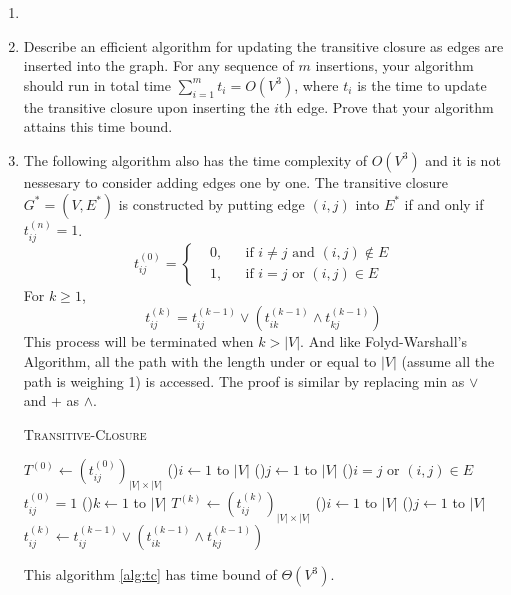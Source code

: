 \documentclass[12pt,a4paper]{article}
\makeatletter
\newtheorem*{solution}{Solution}
\theoremstyle{definition}
\renewenvironment{solution}[1][Solution] {\par\pushQED{\qed}\normalfont\topsep6\p@\@plus6\p@\relax\trivlist\item[\hskip\labelsep\bfseries#1\@addpunct{.}]\ignorespaces}{\popQED\endtrivlist\@endpefalse} \makeatother
\makeatother
\begin{document}
\begin{enumerate}
\begin{enumerate}
\begin{solution}
		\end{solution}
	    \item Describe an efficient algorithm for updating the transitive closure as edges are inserted into the graph. For any sequence of $m$ insertions, your algorithm should run in total time $\sum_{i=1}^m t_i=O(V^3)$, where $t_i$ is the time to update the transitive closure upon inserting the $i$th edge. Prove that your algorithm attains this time bound.
	    \begin{solution}
			The following algorithm also has the time complexity of $O(V^3)$ and it is not nessesary to consider adding edges one by one. The transitive closure $G^*=(V,E^*)$ is constructed by putting edge $(i,j)$ into $E^*$ if and only if $t_{ij}^{(n)}=1$.
			\begin{equation*}
				t_{ij}^{(0)} = \left\{\begin{aligned}
					&0, &&\text{if }i\neq j\text{ and }(i,j)\not\in E\\
					&1, &&\text{if }i = j\text{ or }(i,j)\in E
				\end{aligned}\right.
			\end{equation*}
			For $k\geq 1$,
			\begin{equation*}
				t_{ij}^{(k)}=t_{ij}^{(k-1)}\vee \left(t_{ik}^{(k-1)}\land t_{kj}^{(k-1)}\right)
			\end{equation*}
			This process will be terminated when $k>|V|$. And like Folyd-Warshall's Algorithm, all the path with the length under or equal to $|V|$ (assume all the path is weighing 1) is accessed. The proof is similar by replacing min as $\vee$ and + as $\land$. 
			\begin{algorithm}[h]
				\caption{\textsc{Transitive-Closure}}
				\label{alg:tc}
				\BlankLine
				$T^{(0)}\leftarrow (t_{ij}^{(0)})_{|V|\times|V|}$\;
				\For(){$i\leftarrow 1$ to $|V|$}{
					\For(){$j\leftarrow 1$ to $|V|$}{
						\If(){$i=j$ or $(i,j)\in E$}{
							$t_{ij}^{(0)}=1$\;
						}
					}
				}
				\For(){$k\leftarrow 1$ to $|V|$}{
					$T^{(k)}\leftarrow (t_{ij}^{(k)})_{|V|\times |V|}$\;
					\For(){$i\leftarrow 1$ to $|V|$}{
						\For(){$j\leftarrow 1$ to $|V|$}{
							$t_{ij}^{(k)}\leftarrow t_{ij}^{(k-1)}\vee \left(t_{ik}^{(k-1)}\land t_{kj}^{(k-1)}\right)$\;
						}
					}
				}
				\;
			\end{algorithm}

			This algorithm \ref{alg:tc} has time bound of $\Theta(V^3)$.
		\end{solution}
	\end{enumerate}


\end{enumerate}
\end{document}
